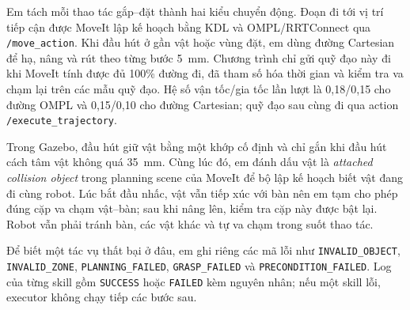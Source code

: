 \documentclass[11pt,a4paper]{article}
\begin{document}
Em tách mỗi thao tác gắp--đặt thành hai kiểu chuyển động. Đoạn đi tới vị trí
tiếp cận được MoveIt lập kế hoạch bằng KDL và OMPL/RRTConnect qua
\texttt{/move\_action}. Khi đầu hút ở gần vật hoặc vùng đặt, em dùng đường
Cartesian để hạ, nâng và rút theo từng bước 5~mm. Chương trình chỉ gửi quỹ
đạo này đi khi MoveIt tính được đủ 100\% đường đi, đã tham số hóa thời gian và
kiểm tra va chạm lại trên các mẫu quỹ đạo. Hệ số vận tốc/gia tốc lần lượt là
0,18/0,15 cho đường OMPL và 0,15/0,10 cho đường Cartesian; quỹ đạo sau cùng
đi qua action \texttt{/execute\_trajectory}.

Trong Gazebo, đầu hút giữ vật bằng một khớp cố định và chỉ gắn khi đầu hút cách
tâm vật không quá 35~mm. Cùng lúc đó, em đánh dấu vật là \emph{attached
collision object} trong planning scene của MoveIt để bộ lập kế hoạch biết vật
đang đi cùng robot. Lúc bắt đầu nhấc, vật vẫn tiếp xúc với bàn nên em tạm cho
phép đúng cặp va chạm vật--bàn; sau khi nâng lên, kiểm tra cặp này được bật
lại. Robot vẫn phải tránh bàn, các vật khác và tự va chạm trong suốt thao tác.

Để biết một tác vụ thất bại ở đâu, em ghi riêng các mã lỗi như
\texttt{INVALID\_OBJECT}, \texttt{INVALID\_ZONE}, \texttt{PLANNING\_FAILED},
\texttt{GRASP\_FAILED} và \texttt{PRECONDITION\_FAILED}. Log của từng skill
gồm \texttt{SUCCESS} hoặc \texttt{FAILED} kèm nguyên nhân; nếu một skill lỗi,
executor không chạy tiếp các bước sau.

\newpage
\end{document}
